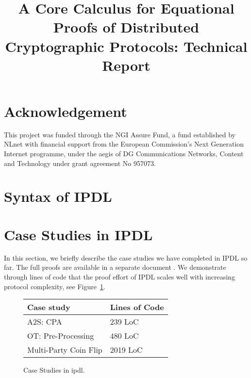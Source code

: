 \documentclass[11pt,hidelinks]{article}
\newcommand{\ipdl}{\textsf{IPDL} }
\begin{document}
\title{A Core Calculus for Equational Proofs of Distributed Cryptographic Protocols: Technical Report}

\maketitle

\section*{\small Acknowledgement}
This project was funded through the NGI Assure Fund, a fund established by NLnet with financial support from the European Commission's Next Generation Internet programme, under the aegis of DG Communications Networks, Content and Technology under grant agreement No 957073.

\section{Syntax of \ipdl}


%


\section{Case Studies in \ipdl}
In this section, we briefly describe the case studies we have completed in \ipdl so far. The full proofs are available in a separate document \cite{case_studies}. We demonstrate through lines of code that the proof effort of \ipdl scales well with increasing
protocol complexity, see Figure~\ref{fig:cases}.

\begin{figure}
\begin{center}
\begin{tabular}{|l|l|}
\hline
Case study & Lines of Code \\
\hline
A2S: CPA & 239 LoC \\
\hline
OT: Pre-Processing & 480 LoC \\
\hline
Multi-Party Coin Flip & 2019 LoC \\
\hline
\end{tabular}
\end{center}
\caption{Case Studies in \textsf{ipdl}.}
\label{fig:cases}
\end{figure}
\end{document}

